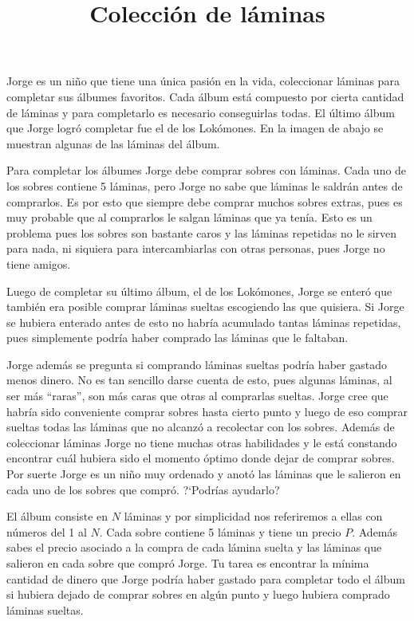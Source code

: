 \documentclass{oci}
\title{Colección de láminas}
\begin{document}
\begin{problemDescription}
Jorge es un niño que tiene una única pasión en la vida, coleccionar láminas para
completar sus álbumes favoritos. Cada álbum está compuesto por cierta cantidad
de láminas y para completarlo es necesario conseguirlas todas. El último álbum
que Jorge logró completar fue el de los Lokómones. En la imagen de abajo se
muestran algunas de las láminas del álbum.

Para completar los álbumes Jorge debe comprar sobres con láminas. Cada uno de
los sobres contiene 5 láminas, pero Jorge no sabe que láminas le saldrán antes
de comprarlos. Es por esto que siempre debe comprar muchos sobres extras, pues
es muy probable que al comprarlos le salgan láminas que ya tenía. Esto es un
problema pues los sobres son bastante caros y las láminas repetidas no le sirven
para nada, ni siquiera para intercambiarlas con otras personas, pues Jorge no
tiene amigos.

Luego de completar su último álbum, el de los Lokómones, Jorge se enteró que
también era posible comprar láminas sueltas escogiendo las que quisiera. Si
Jorge se hubiera enterado antes de esto no habría acumulado tantas láminas
repetidas, pues simplemente podría haber comprado las láminas que le faltaban.

Jorge además se pregunta si comprando láminas sueltas podría haber gastado menos
dinero. No es tan sencillo darse cuenta de esto, pues algunas láminas, al ser más
``raras'', son más caras que otras al comprarlas sueltas. Jorge cree que habría
sido conveniente comprar sobres hasta cierto punto y luego de eso comprar
sueltas todas las láminas que no alcanzó a recolectar con los sobres. Además de
coleccionar láminas Jorge no tiene muchas otras habilidades y le está constando
encontrar cuál hubiera sido el momento óptimo donde dejar de comprar sobres. Por
suerte Jorge es un niño muy ordenado y anotó las láminas que le salieron en
cada uno de los sobres que compró. ?`Podrías ayudarlo?

El álbum consiste en $N$ láminas y por simplicidad nos referiremos a ellas con
números del 1 al $N$. Cada sobre contiene 5 láminas y tiene un precio $P$.
Además sabes el precio asociado a la compra de cada lámina suelta y las láminas
que salieron en cada sobre que compró Jorge. Tu tarea es encontrar la mínima
cantidad de dinero que Jorge podría haber gastado para completar todo el álbum
si hubiera dejado de comprar sobres en algún punto y luego hubiera comprado
láminas sueltas.
\end{problemDescription}
\end{document}
